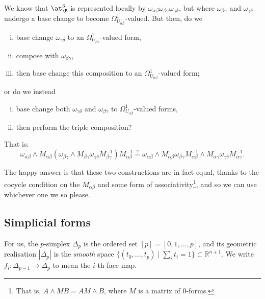         \begin{example}
            We know that $\at_\E^3$ is represented locally by $\omega_{\alpha\beta}\omega_{\beta\gamma}\omega_{\gamma\delta}$, but where $\omega_{\beta\gamma}$ and $\omega_{\gamma\delta}$ undergo a base change to become $\Omega_{U_{\alpha\beta}}^1$-valued.
            But then, do we
            \begin{enumerate}[(i)]
                \item base change $\omega_{\gamma\delta}$ to an $\Omega_{U_{\beta\gamma}}^1$-valued form,
                \item compose with $\omega_{\beta\gamma}$,
                \item then base change this composition to an $\Omega_{U_{\alpha\beta}}^1$-valued form;
            \end{enumerate}
            or do we instead
            \begin{enumerate}[(i)]
                \item base change both $\omega_{\gamma\delta}$ and $\omega_{\beta\gamma}$ to $\Omega_{U_{\alpha\beta}}^1$-valued forms,
                \item then perform the triple composition?
            \end{enumerate}
            That is:
            \[
                \omega_{\alpha\beta} \wedge M_{\alpha\beta}(\omega_{\beta\gamma} \wedge M_{\beta\gamma}\omega_{\gamma\delta}M_{\beta\gamma}^{-1})M_{\alpha\beta}^{-1} \overset{?}{=} \omega_{\alpha\beta} \wedge M_{\alpha\beta}\omega_{\beta\gamma}M_{\alpha\beta}^{-1} \wedge M_{\alpha\gamma}\omega_{\gamma\delta}M_{\alpha\gamma}^{-1}.
            \]

            The happy answer is that these two constructions are in fact equal, thanks to the cocycle condition on the $M_{\alpha\beta}$ and some form of associativity\footnote{That is, $A\wedge MB = AM\wedge B$, where $M$ is a matrix of $0$-forms.}, and so we can use whichever one we so please.
        \end{example}

    \subsection{Simplicial forms} %
    \label{sub:simplicial_forms}
    
        \begin{note}
            For us, the $p$-simplex $\Delta_p$ is the ordered set $[p]=[0,1,\ldots,p]$, and its geometric realisation $|\Delta_p|$ is the \emph{smooth} space $\big\{(t_0,\ldots,t_p)\mid \sum_i t_i=1\big\}\subset\mathbb{R}^{n+1}$.
            We write $f_i\colon\Delta_{p-1}\to\Delta_p$ to mean the $i$-th face map.
        \end{note}

